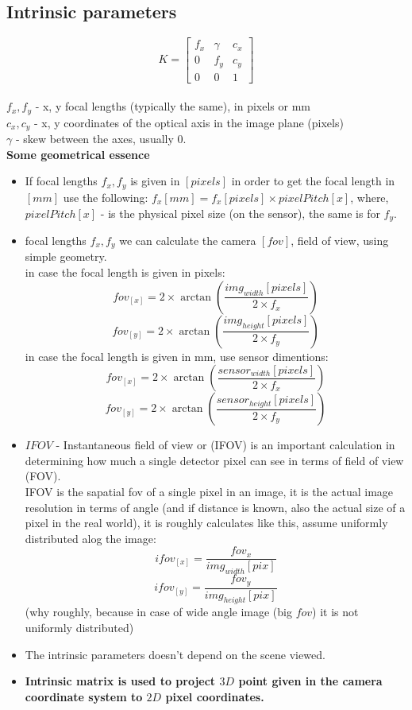 \documentclass{article}
\begin{document}
\subsection{Intrinsic parameters}
$$K = \begin{bmatrix}
f_x & \gamma & c_x \\
0 & f_y & c_y \\
0 & 0 & 1
\end{bmatrix} $$\\
$f_x, f_y$ - x, y focal lengths (typically the same), in pixels or mm \\
$c_x, c_y$ - x, y coordinates of the optical axis in the image plane (pixels) \\
$\gamma$ - skew between the axes, usually 0.\\
\textbf{Some geometrical essence}
\begin{itemize}
	\item If focal lengths  $f_x, f_y$ is given in $\left[ pixels \right]$ in order to get the focal length in $\left[ mm \right]$ use the following: $f_x\left[ mm \right] = f_x\left[ pixels \right]\times pixelPitch[x]$, where, $pixelPitch[x]$ - is the physical pixel size (on the sensor), the same is for $f_y$.
	\item focal lengths  $f_x, f_y$  we can calculate the camera $\left[fov\right]$, field of view, using simple geometry.\\
	in case the focal length is given in pixels:
	$$fov_{[x]} = 2\times\arctan{\left(\frac{img_{width}\left[pixels\right]}{2\times f_x}\right)} $$
    $$fov_{[y]} = 2\times\arctan{\left(\frac{img_{height}\left[pixels\right]}{2\times f_y}\right)} $$
in case the focal length is given in mm, use sensor dimentions:
	$$fov_{[x]} = 2\times\arctan{\left(\frac{sensor_{width}\left[pixels\right]}{2\times f_x}\right)} $$
    $$fov_{[y]} = 2\times\arctan{\left(\frac{sensor_{height}\left[pixels\right]}{2\times f_y}\right)} $$   
    \item $IFOV$ - Instantaneous field of view or (IFOV) is an important calculation in determining how much a single detector pixel can see in terms of field of view (FOV).\\
    IFOV is the sapatial fov of a single pixel in an image, it is the actual image resolution in terms of angle (and if distance is known, also the actual size of a pixel in the real world), it is roughly  calculates like this, assume uniformly distributed alog the image:
    $$ifov_{[x]} = \frac{fov_x}{img_{width}[pix]} $$
    $$ifov_{[y]} = \frac{fov_y}{img_{height}[pix]} $$
    (why roughly, because in case of wide angle image (big $fov$) it is not uniformly distributed)
    \item The intrinsic parameters doesn't depend on the scene viewed.
	\item \textbf{Intrinsic matrix is used to project $3D$ point given in the camera coordinate system to $2D$ pixel coordinates.}
\end{itemize}
\end{document}
